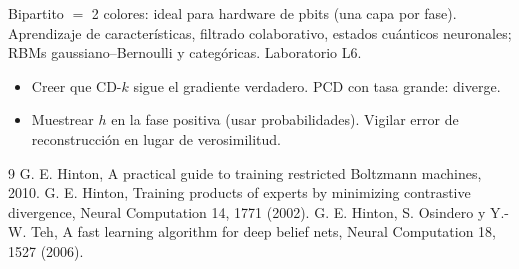\documentclass[11pt,a4paper]{article}
\begin{document}
\begin{aplicacion}
Bipartito $=$ 2 colores: ideal para hardware de pbits (una capa por fase). Aprendizaje de características, filtrado colaborativo, estados cuánticos
neuronales; RBMs gaussiano--Bernoulli y categóricas. Laboratorio L6.
\end{aplicacion}

\begin{error}
\begin{itemize}[nosep]
\item Creer que CD-$k$ sigue el gradiente verdadero. \quad PCD con tasa grande: diverge.
\item Muestrear $h$ en la fase positiva (usar probabilidades). \quad Vigilar error de reconstrucción en lugar de verosimilitud.
\end{itemize}
\end{error}

\begin{thebibliography}{9}\small
{} G. E. Hinton, A practical guide to training restricted Boltzmann machines, 2010.
 G. E. Hinton, Training products of experts by minimizing contrastive divergence, Neural Computation 14, 1771 (2002).
 G. E. Hinton, S. Osindero y Y.-W. Teh, A fast learning algorithm for deep belief nets, Neural Computation 18, 1527 (2006).
\end{thebibliography}
\end{document}
